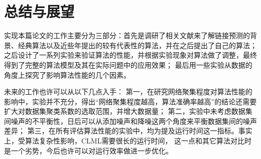 \chapter{总结与展望}
实现本篇论文的工作主要分为三部分：首先是调研了相关文献来了解链接预测的背景、经典算法以及近些年提出的较有代表性的算法，并在之后提出了自己的算法；
之后设计了一系列实验来验证算法的性能，并根据实验现象对算法做了调整，最终得到了完整的算法模型及其在实际问题中的应用效果；
最后用一些实验从数据的角度上探究了影响算法性能的几个因素。


未来的工作也许可以从以下几点入手：
第一，在研究网络聚集程度对算法性能的影响中，实验并不充分，得出“网络聚集程度越高，算法准确率越高”的结论还需要扩大对数据集聚类系数的选取范围，并增大数据量；
第二，实验中未考虑数据集间噪声的不平衡性，日后可以从添加噪声和降噪这两个角度来平衡数据集间的噪声差异；
第三，在所有评估算法性能的实验中，均为提及运行时间这一指标。事实上，受算法复杂性影响，CLML需要很长的运行时间，
这一点和其它算法对比时是一个劣势，今后也许可以对运行效率做进一步优化。